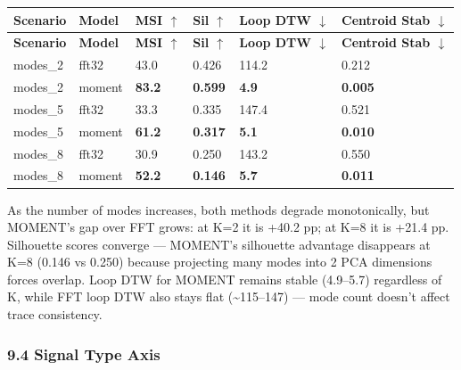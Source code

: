 \documentclass[11pt,a4paper]{article}
\begin{document}
\begin{longtable}{|l|l|l|l|l|l|}
\hline
\textbf{Scenario} & \textbf{Model} & \textbf{MSI $\uparrow$} & \textbf{Sil $\uparrow$} & \textbf{Loop DTW $\downarrow$} & \textbf{Centroid Stab $\downarrow$} \\
\hline
\endfirsthead
\hline
\textbf{Scenario} & \textbf{Model} & \textbf{MSI $\uparrow$} & \textbf{Sil $\uparrow$} & \textbf{Loop DTW $\downarrow$} & \textbf{Centroid Stab $\downarrow$} \\
\hline
\endhead
\hline
\endfoot
modes\_2 & fft32 & 43.0 & 0.426 & 114.2 & 0.212 \\
\hline
modes\_2 & moment & \textbf{83.2} & \textbf{0.599} & \textbf{4.9} & \textbf{0.005} \\
\hline
modes\_5 & fft32 & 33.3 & 0.335 & 147.4 & 0.521 \\
\hline
modes\_5 & moment & \textbf{61.2} & \textbf{0.317} & \textbf{5.1} & \textbf{0.010} \\
\hline
modes\_8 & fft32 & 30.9 & 0.250 & 143.2 & 0.550 \\
\hline
modes\_8 & moment & \textbf{52.2} & \textbf{0.146} & \textbf{5.7} & \textbf{0.011} \\
\hline
\end{longtable}

As the number of modes increases, both methods degrade monotonically, but MOMENT's gap over FFT
grows: at K=2 it is +40.2 pp; at K=8 it is +21.4 pp. Silhouette scores converge --- MOMENT's
silhouette advantage disappears at K=8 (0.146 vs 0.250) because projecting many modes into 2
PCA dimensions forces overlap. Loop DTW for MOMENT remains stable (4.9--5.7) regardless of K,
while FFT loop DTW also stays flat (\textasciitilde{}115--147) --- mode count doesn't affect trace consistency.

\subsubsection{9.4 Signal Type Axis}
\end{document}
